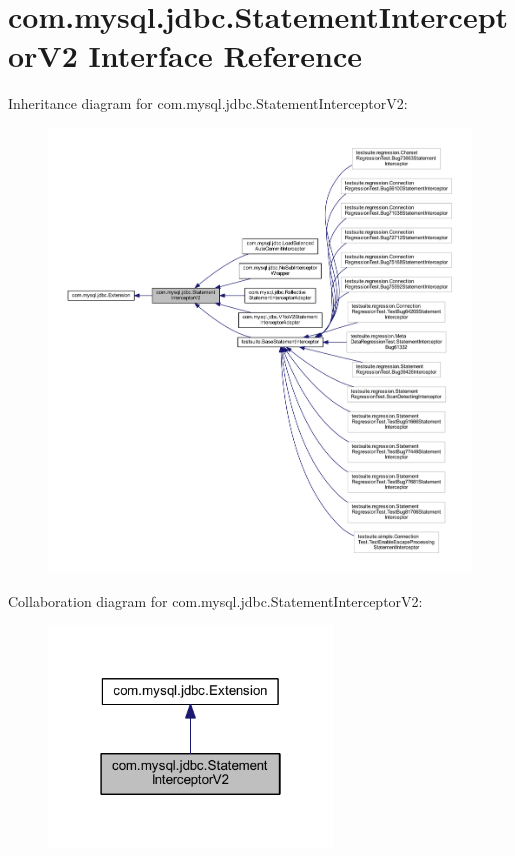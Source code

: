 \hypertarget{interfacecom_1_1mysql_1_1jdbc_1_1_statement_interceptor_v2}{}\section{com.\+mysql.\+jdbc.\+Statement\+Interceptor\+V2 Interface Reference}
\label{interfacecom_1_1mysql_1_1jdbc_1_1_statement_interceptor_v2}


Inheritance diagram for com.\+mysql.\+jdbc.\+Statement\+Interceptor\+V2\+:
\nopagebreak
\begin{figure}[H]
\begin{center}
\leavevmode
\includegraphics[width=350pt]{interfacecom_1_1mysql_1_1jdbc_1_1_statement_interceptor_v2__inherit__graph}
\end{center}
\end{figure}


Collaboration diagram for com.\+mysql.\+jdbc.\+Statement\+Interceptor\+V2\+:
\nopagebreak
\begin{figure}[H]
\begin{center}
\leavevmode
\includegraphics[width=214pt]{interfacecom_1_1mysql_1_1jdbc_1_1_statement_interceptor_v2__coll__graph}
\end{center}
\end{figure}
